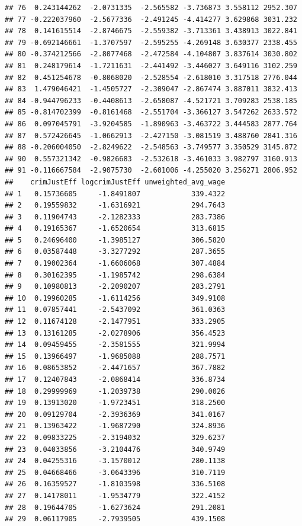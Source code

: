 \documentclass[]{article}
\begin{document}
\begin{verbatim}
## 76  0.243144262  -2.0731335  -2.565582 -3.736873 3.558112 2952.307
## 77 -0.222037960  -2.5677336  -2.491245 -4.414277 3.629868 3031.232
## 78  0.141615514  -2.8746675  -2.559382 -3.713361 3.438913 3022.841
## 79 -0.692146661  -1.3707597  -2.595255 -4.269148 3.630377 2338.455
## 80 -0.374212566  -2.8077468  -2.472584 -4.104807 3.837614 3030.802
## 81  0.248179614  -1.7211631  -2.441492 -3.446027 3.649116 3102.259
## 82  0.451254678  -0.8068020  -2.528554 -2.618010 3.317518 2776.044
## 83  1.479046421  -1.4505727  -2.309047 -2.867474 3.887011 3832.413
## 84 -0.944796233  -0.4408613  -2.658087 -4.521721 3.709283 2538.185
## 85 -0.814702399  -0.8161468  -2.551704 -3.366127 3.547262 2633.572
## 86  0.097045791  -3.9204585  -1.890963 -3.463722 3.444583 2877.764
## 87  0.572426645  -1.0662913  -2.427150 -3.081519 3.488760 2841.316
## 88 -0.206004050  -2.8249622  -2.548563 -3.749577 3.350529 3145.872
## 90  0.557321342  -0.9826683  -2.532618 -3.461033 3.982797 3160.913
## 91 -0.116667584  -2.9075730  -2.601006 -4.255020 3.256271 2806.952
##    crimJustEff logcrimJustEff unweighted_avg_wage
## 1   0.15736605     -1.8491807            339.4322
## 2   0.19559832     -1.6316921            294.7643
## 3   0.11904743     -2.1282333            283.7386
## 4   0.19165367     -1.6520654            313.6815
## 5   0.24696400     -1.3985127            306.5820
## 6   0.03587448     -3.3277292            287.3655
## 7   0.19002364     -1.6606068            307.4884
## 8   0.30162395     -1.1985742            298.6384
## 9   0.10980813     -2.2090207            283.2791
## 10  0.19960285     -1.6114256            349.9108
## 11  0.07857441     -2.5437092            361.0363
## 12  0.11674128     -2.1477951            333.2905
## 13  0.13161285     -2.0278906            356.4523
## 14  0.09459455     -2.3581555            321.9994
## 15  0.13966497     -1.9685088            288.7571
## 16  0.08653852     -2.4471657            367.7882
## 17  0.12407843     -2.0868414            336.8734
## 18  0.29999969     -1.2039738            290.0026
## 19  0.13913020     -1.9723451            318.2500
## 20  0.09129704     -2.3936369            341.0167
## 21  0.13963422     -1.9687290            324.8936
## 22  0.09833225     -2.3194032            329.6237
## 23  0.04033856     -3.2104476            340.9749
## 24  0.04255316     -3.1570012            280.1138
## 25  0.04668466     -3.0643396            310.7119
## 26  0.16359527     -1.8103598            336.5108
## 27  0.14178011     -1.9534779            322.4152
## 28  0.19644705     -1.6273624            291.2081
## 29  0.06117905     -2.7939505            439.1508

\end{verbatim}
\end{document}

